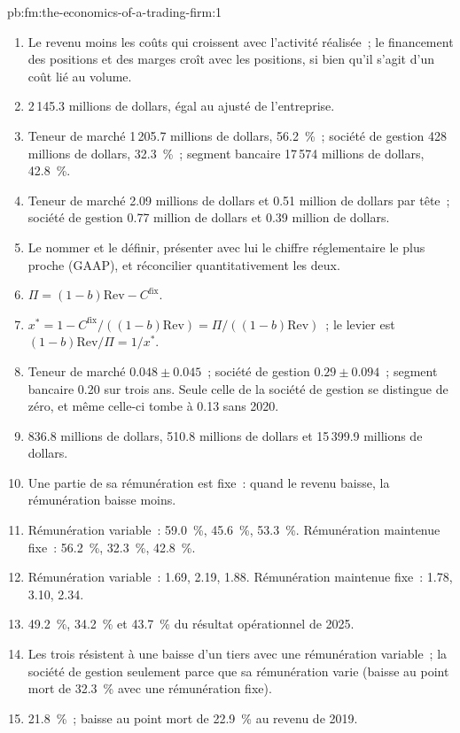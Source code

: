 \begin{solution}{pb:fm:the-economics-of-a-trading-firm:1}
\begin{enumerate}
\item Le revenu moins les coûts qui croissent avec l'activité réalisée~; le financement des positions et des marges croît avec les positions, si bien qu'il s'agit d'un coût lié au volume.
\item 2\,145.3 millions de dollars, égal au  ajusté de l'entreprise.
\item Teneur de marché 1\,205.7 millions de dollars, 56.2~\%~; société de gestion 428 millions de dollars, 32.3~\%~; segment bancaire 17\,574 millions de dollars, 42.8~\%.
\item Teneur de marché 2.09 millions de dollars et 0.51 million de dollars par tête~; société de gestion 0.77 million de dollars et 0.39 million de dollars.
\item Le nommer et le définir, présenter avec lui le chiffre réglementaire le plus proche (GAAP), et réconcilier quantitativement les deux.
\item $\Pi=(1-b)\mathrm{Rev}-C^{\mathrm{fix}}$.
\item $x^\ast=1-C^{\mathrm{fix}}/((1-b)\mathrm{Rev})=\Pi/((1-b)\mathrm{Rev})$~; le levier est $(1-b)\mathrm{Rev}/\Pi=1/x^\ast$.
\item Teneur de marché $0.048\pm0.045$~; société de gestion $0.29\pm0.094$~; segment bancaire 0.20 sur trois ans. Seule celle de la société de gestion se distingue
de zéro, et même celle-ci tombe à 0.13 sans 2020.
\item 836.8 millions de dollars, 510.8 millions de dollars et 15\,399.9 millions de dollars.
\item Une partie de sa rémunération est fixe~: quand le revenu baisse, la rémunération baisse moins.
\item Rémunération variable~: 59.0~\%, 45.6~\%, 53.3~\%. Rémunération maintenue fixe~: 56.2~\%, 32.3~\%, 42.8~\%.
\item Rémunération variable~: 1.69, 2.19, 1.88. Rémunération maintenue fixe~: 1.78, 3.10, 2.34.
\item 49.2~\%, 34.2~\% et 43.7~\% du résultat opérationnel de 2025.
\item Les trois résistent à une baisse d'un tiers avec une rémunération variable~; la société de gestion seulement parce que sa rémunération varie (baisse au point mort de 32.3~\% avec une rémunération fixe).
\item 21.8~\%~; baisse au point mort de 22.9~\% au revenu de 2019.

\end{enumerate}
\end{solution}
